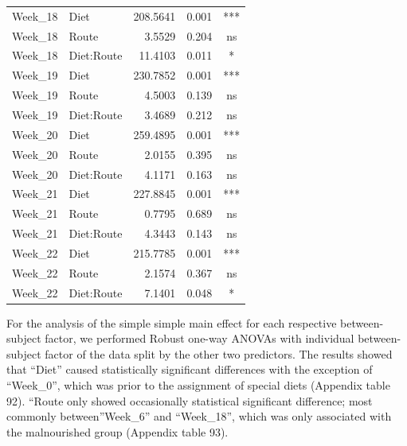 \documentclass[
  12pt,
  letterpaper,
]{article}
\begin{document}
\begin{longtable}{l|lrrc}
Week\_18 & Diet & 208.5641 & 0.001 & *** \\ 
Week\_18 & Route & 3.5529 & 0.204 & ns \\ 
Week\_18 & Diet:Route & 11.4103 & 0.011 & * \\ 
Week\_19 & Diet & 230.7852 & 0.001 & *** \\ 
Week\_19 & Route & 4.5003 & 0.139 & ns \\ 
Week\_19 & Diet:Route & 3.4689 & 0.212 & ns \\ 
Week\_20 & Diet & 259.4895 & 0.001 & *** \\ 
Week\_20 & Route & 2.0155 & 0.395 & ns \\ 
Week\_20 & Diet:Route & 4.1171 & 0.163 & ns \\ 
Week\_21 & Diet & 227.8845 & 0.001 & *** \\ 
Week\_21 & Route & 0.7795 & 0.689 & ns \\ 
Week\_21 & Diet:Route & 4.3443 & 0.143 & ns \\ 
Week\_22 & Diet & 215.7785 & 0.001 & *** \\ 
Week\_22 & Route & 2.1574 & 0.367 & ns \\ 
Week\_22 & Diet:Route & 7.1401 & 0.048 & * \\ 
\bottomrule
\end{longtable}
\endgroup

For the analysis of the simple simple main effect for each respective between-subject factor, we performed Robust one-way ANOVAs with individual between-subject factor of the data split by the other two predictors. The results showed that ``Diet'' caused statistically significant differences with the exception of ``Week\_0'', which was prior to the assignment of special diets (Appendix table 92). ``Route only showed occasionally statistical significant difference; most commonly between''Week\_6'' and ``Week\_18'', which was only associated with the malnourished group (Appendix table 93).
\end{document}
